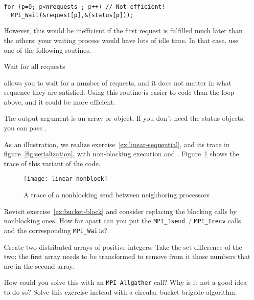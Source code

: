 \begin{lstlisting}
for (p=0; p<nrequests ; p++) // Not efficient!
  MPI_Wait(&request[p],&(status[p]));
\end{lstlisting}

However, this would be inefficient if the first request is fulfilled
much later than the others: your waiting process would have lots of
idle time. In that case, use one of the following routines.

 {Wait for all requests}
  
 allows you to wait for a number of
requests, and it does not matter in what sequence they are
satisfied. Using this routine is easier to code than the loop above,
and it could be more efficient.
%

The output argument is an array or  object.
If you don't need the status objects, you can pass
.

As an illustration, we realize exercise~\ref{ex:linear-sequential},
and its trace in figure~\ref{fig:serialization},
with non-blocking execution and .
Figure~\ref{fig:jump-nonblock} shows the trace of this variant of the code.

\begin{figure}[ht]
\texttt{[image: linear-nonblock]}
\caption{A trace of a nonblocking send between neighboring processors}
\label{fig:jump-nonblock}
\end{figure}

\begin{exercise}
  \label{ex:bucket-nonblock}
  Revisit exercise~\ref{ex:bucket-block} and consider replacing the
  blocking calls by nonblocking ones. How far apart can you put the
  \lstinline{MPI_Isend}~/ \lstinline{MPI_Irecv} calls and the
  corresponding \lstinline{MPI_Wait}s?
\end{exercise}

\begin{exercise}
  \label{ex:setdiff}
  Create two distributed arrays of positive integers.
  Take the set difference of the two:
  the first array needs to be transformed to remove from it those numbers
  that are in the second array.

  How could you solve this with an \lstinline+MPI_Allgather+ call?
  Why is it not a good idea to do so?
  Solve this exercise instead with a circular bucket brigade algorithm.
\end{exercise}

